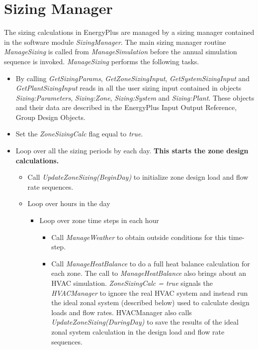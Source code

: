 \section{Sizing Manager}\label{sizing-manager}

The sizing calculations in EnergyPlus are managed by a sizing manager contained in the software module \emph{SizingManager}. The main sizing manager routine \emph{ManageSizing} is called from \emph{ManageSimulation} before the annual simulation sequence is invoked. \emph{ManageSizing} performs the following tasks.

\begin{itemize}
  \item
    By calling \emph{GetSizingParams}, \emph{GetZoneSizingInput}, \emph{GetSystemSizingInput} and \emph{GetPlantSizingInput} reads in all the user sizing input contained in objects \emph{Sizing:Parameters}, \emph{Sizing:Zone}, \emph{Sizing:System} and \emph{Sizing:Plant}. These objects and their data are described in the EnergyPlus Input Output Reference, Group Design Objects.
  \item
    Set the \emph{ZoneSizingCalc} flag equal to \emph{true}.
  \item
    Loop over all the sizing periods by each day. \textbf{This starts the zone design calculations.}
    \begin{itemize}
      \item
        Call \emph{UpdateZoneSizing(BeginDay)} to initialize zone design load and flow rate sequences.
      \item
        Loop over hours in the day
        \begin{itemize}
          \item
            Loop over zone time steps in each hour
            \begin{itemize}
              \item
                Call \emph{ManageWeather} to obtain outside conditions for this time-step.
              \item
                Call \emph{ManageHeatBalance} to do a full heat balance calculation for each zone. The call to \emph{ManageHeatBalance} also brings about an HVAC simulation. \emph{ZoneSizingCalc = true} signals the \emph{HVACManager} to ignore the real HVAC system and instead run the ideal zonal system (described below) used to calculate design loads and flow rates. HVACManager also calls \emph{UpdateZoneSizing(DuringDay)} to save the results of the ideal zonal system calculation in the design load and flow rate sequences.

\end{itemize}
\end{itemize}
\end{itemize}
\end{itemize}
